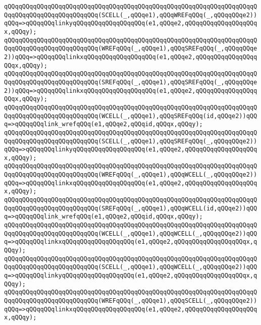 \verb|qQQqqQQqqQQqqQQqqQQqqQQqqQQqqQQqqQQqqQQqqQQqqQQqqQQqqQQqqQQqqQQqqQQqqQQqqQQqqQQqqQQqqQQqqQQqqQQq(SCELL(_,qQQqe1),qQQqWREFqQQq(_,qQQqqQQqe2))qQQq=>qQQqqQQqlinkyqQQqqQQqqQQqqQQqqQQq(e1,qQQqe2,qQQqqQQqqQQqqQQqqQQqx,qQQqy);|\newline
\newline
\verb|qQQqqQQqqQQqqQQqqQQqqQQqqQQqqQQqqQQqqQQqqQQqqQQqqQQqqQQqqQQqqQQqqQQqqQQqqQQqqQQqqQQqqQQqqQQqqQQq(WREFqQQq(_,qQQqe1),qQQqSREFqQQq(_,qQQqqQQqe2))qQQq=>qQQqqQQqlinkxqQQqqQQqqQQqqQQqqQQq(e1,qQQqe2,qQQqqQQqqQQqqQQqqQQqx,qQQqy);|\newline
\verb|qQQqqQQqqQQqqQQqqQQqqQQqqQQqqQQqqQQqqQQqqQQqqQQqqQQqqQQqqQQqqQQqqQQqqQQqqQQqqQQqqQQqqQQqqQQqqQQq(SREFqQQq(_,qQQqe1),qQQqSREFqQQq(_,qQQqqQQqe2))qQQq=>qQQqqQQqlinkxqQQqqQQqqQQqqQQqqQQq(e1,qQQqe2,qQQqqQQqqQQqqQQqqQQqx,qQQqy);|\newline
\verb|qQQqqQQqqQQqqQQqqQQqqQQqqQQqqQQqqQQqqQQqqQQqqQQqqQQqqQQqqQQqqQQqqQQqqQQqqQQqqQQqqQQqqQQqqQQqqQQq(WCELL(_,qQQqe1),qQQqSREFqQQq(id,qQQqe2))qQQq=>qQQqqQQqlink_wrefqQQq(e1,qQQqe2,qQQqid,qQQqx,qQQqy);|\newline
\verb|qQQqqQQqqQQqqQQqqQQqqQQqqQQqqQQqqQQqqQQqqQQqqQQqqQQqqQQqqQQqqQQqqQQqqQQqqQQqqQQqqQQqqQQqqQQqqQQq(SCELL(_,qQQqe1),qQQqSREFqQQq(_,qQQqqQQqe2))qQQq=>qQQqqQQqlinkyqQQqqQQqqQQqqQQqqQQq(e1,qQQqe2,qQQqqQQqqQQqqQQqqQQqx,qQQqy);|\newline
\newline
\verb|qQQqqQQqqQQqqQQqqQQqqQQqqQQqqQQqqQQqqQQqqQQqqQQqqQQqqQQqqQQqqQQqqQQqqQQqqQQqqQQqqQQqqQQqqQQqqQQq(WREFqQQq(_,qQQqe1),qQQqWCELL(_,qQQqqQQqe2))qQQq=>qQQqqQQqlinkxqQQqqQQqqQQqqQQqqQQq(e1,qQQqe2,qQQqqQQqqQQqqQQqqQQqx,qQQqy);|\newline
\verb|qQQqqQQqqQQqqQQqqQQqqQQqqQQqqQQqqQQqqQQqqQQqqQQqqQQqqQQqqQQqqQQqqQQqqQQqqQQqqQQqqQQqqQQqqQQqqQQq(SREFqQQq(_,qQQqe1),qQQqWCELL(id,qQQqe2))qQQq=>qQQqqQQqlink_wrefqQQq(e1,qQQqe2,qQQqid,qQQqx,qQQqy);|\newline
\verb|qQQqqQQqqQQqqQQqqQQqqQQqqQQqqQQqqQQqqQQqqQQqqQQqqQQqqQQqqQQqqQQqqQQqqQQqqQQqqQQqqQQqqQQqqQQqqQQq(WCELL(_,qQQqe1),qQQqWCELL(_,qQQqqQQqe2))qQQq=>qQQqqQQqlinkxqQQqqQQqqQQqqQQqqQQq(e1,qQQqe2,qQQqqQQqqQQqqQQqqQQqx,qQQqy);|\newline
\verb|qQQqqQQqqQQqqQQqqQQqqQQqqQQqqQQqqQQqqQQqqQQqqQQqqQQqqQQqqQQqqQQqqQQqqQQqqQQqqQQqqQQqqQQqqQQqqQQq(SCELL(_,qQQqe1),qQQqWCELL(_,qQQqqQQqe2))qQQq=>qQQqqQQqlinkyqQQqqQQqqQQqqQQqqQQq(e1,qQQqe2,qQQqqQQqqQQqqQQqqQQqx,qQQqy);|\newline
\newline
\verb|qQQqqQQqqQQqqQQqqQQqqQQqqQQqqQQqqQQqqQQqqQQqqQQqqQQqqQQqqQQqqQQqqQQqqQQqqQQqqQQqqQQqqQQqqQQqqQQq(WREFqQQq(_,qQQqe1),qQQqSCELL(_,qQQqqQQqe2))qQQq=>qQQqqQQqlinkxqQQqqQQqqQQqqQQqqQQq(e1,qQQqe2,qQQqqQQqqQQqqQQqqQQqx,qQQqy);|\newline
